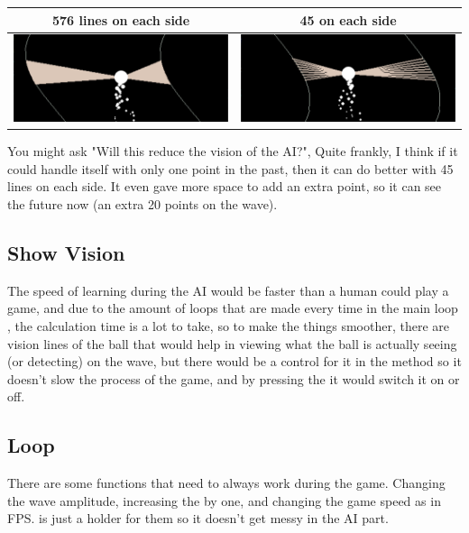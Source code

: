 \begin{table}[H]
	\centering
\begin{tabular}{|c|c|}
	\hline
	576 lines on each side	& 45 on each side \\ \hline
		\includegraphics[width=0.5\linewidth]{"usedImages/vision 576 lines"}& \includegraphics[width=0.5\linewidth]{"usedImages/vision 45 lines"} \\ \hline
	\end{tabular}
\end{table}

You might ask "Will this reduce the vision of the AI?", Quite frankly, I think if it could handle itself with only one point in the past, then it can do better with 45 lines on each side. It even gave more space to add an extra point, so it can see the future now (an extra 20 points on the wave).

\subsection{Show Vision}
The speed of learning during the AI would be faster than a human could play a game, and due to the amount of loops that are made every time in the main loop , the calculation time is a lot to take, so to make the things smoother, there are vision lines of the ball that would help in viewing what the ball is actually seeing (or detecting) on the wave, but there would be a control for it in the  method so it doesn't slow the process of the game, and by pressing the  it would switch it on or off. 

\subsection{Loop}
There are some functions that need to always work during the game. Changing the wave amplitude, increasing the  by one, and changing the game speed as in FPS.  is just a holder for them so it doesn't get messy in the AI part.


